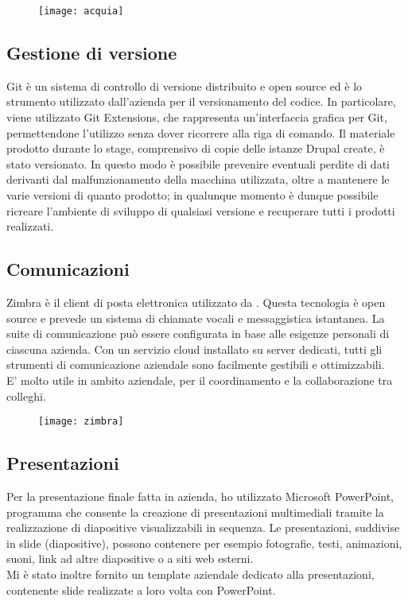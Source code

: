 		\begin{figure}[htbp]
			\begin{center}
				\texttt{[image: acquia]}
			\end{center}
		\end{figure}
	
	\subsection{Gestione di versione}
	\gls{Git} è un sistema di controllo di versione distribuito e \gls{open source} ed è lo strumento utilizzato dall'azienda per il versionamento del codice. In particolare, viene utilizzato \gls{Git Extensions}, che rappresenta un'interfaccia grafica per \gls{Git}, permettendone l'utilizzo senza dover ricorrere alla riga di comando.
	Il materiale prodotto durante lo stage, comprensivo di copie delle istanze \gls{Drupal} create, è stato versionato. In questo modo è possibile prevenire eventuali perdite di dati derivanti dal malfunzionamento della macchina utilizzata, oltre a mantenere le varie versioni di quanto prodotto; in qualunque momento è dunque possibile ricreare l'ambiente di sviluppo di qualsiasi versione e recuperare tutti i prodotti realizzati.
		
	\subsection{Comunicazioni}
	\gls{Zimbra} è il client di posta elettronica utilizzato da \nomeAzienda. Questa tecnologia è \gls{open source} e prevede un sistema di chiamate vocali e messaggistica istantanea. La suite di comunicazione può essere configurata in base alle esigenze personali di ciascuna azienda. Con un servizio cloud installato su server dedicati, tutti gli strumenti di comunicazione aziendale sono facilmente gestibili e ottimizzabili. \\
	E' molto utile in ambito aziendale, per il coordinamento e la collaborazione tra colleghi.
	
	\begin{figure}[htbp]
		\begin{center}
			\texttt{[image: zimbra]}
		\end{center}
	\end{figure}
	
	\subsection{Presentazioni}
	Per la presentazione finale fatta in azienda, ho utilizzato Microsoft PowerPoint, programma che consente la creazione di presentazioni multimediali tramite la realizzazione di diapositive visualizzabili in sequenza. Le presentazioni, suddivise in slide (diapositive), possono contenere per esempio fotografie, testi, animazioni, suoni, link ad altre diapositive o a siti web esterni. \\
	Mi è stato inoltre fornito un template aziendale dedicato alla presentazioni, contenente slide realizzate a loro volta con PowerPoint.

